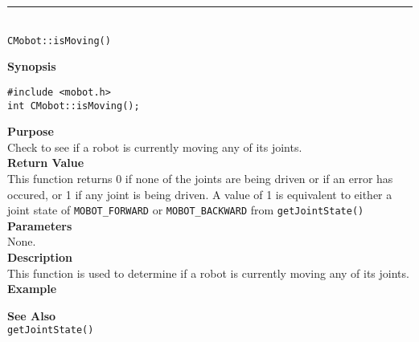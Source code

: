 \noindent
\vspace{5pt}
\rule{4.5in}{0.015in}\\
\noindent
{\LARGE \texttt{CMobot::isMoving()}}\\
{}

\noindent
{\bf Synopsis}
\vspace{-8pt}
\begin{verbatim}
#include <mobot.h>
int CMobot::isMoving();
\end{verbatim}

\noindent
{\bf Purpose}\\
Check to see if a robot is currently moving any of its joints.\\

\noindent
{\bf Return Value}\\
This function returns 0 if none of the joints are being driven or if an error
has occured, or 1 if any joint is being driven. A value of 1 is equivalent to 
either a joint state of \texttt{MOBOT\_FORWARD} or \texttt{MOBOT\_BACKWARD} 
from \texttt{getJointState()}\\ 

\noindent
{\bf Parameters}\\
None.\\

\noindent
{\bf Description}\\
This function is used to determine if a robot is currently moving any of
its joints. \\

\noindent
{\bf Example}\\
\noindent

\noindent
{\bf See Also}\\
\texttt{getJointState()}

